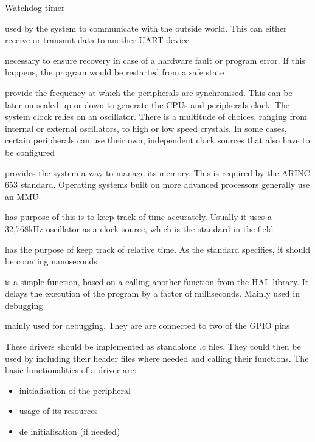 \begin{labeling}{Watchdog timer}
	\item [\textbf{UART}] used by the system to communicate with the outside
	world. This can either receive or transmit data to another UART device
	\item [\textbf{Watchdog timer}] necessary to ensure recovery
	in case of a hardware fault or program error. If this happens, the
	program would be restarted from a safe state
	\item [\textbf{System Clock}] provide the frequency at which the
	peripherals are synchronised. This can be later on scaled up or down
	to generate the CPU\textquotesingle s and peripherals\textquotesingle
	clock.
	The system clock relies on an oscillator.
	There is a multitude of choices, ranging from internal or external
	oscillators, to high or low speed crystals. In some cases, certain
	peripherals can use their own, independent clock sources that also have
	to be configured
	\item [\textbf{MPU}] provides the system a way to manage its
	memory. This is required by the ARINC 653 standard. 
	Operating systems built on more advanced processors generally use 
	an MMU
	\item [\textbf{RTC}] has purpose of this is to keep track of 
	time accurately. Usually it uses  a 32,768kHz oscillator as a 
	clock source, which is the standard in the field
	\item [\textbf{Timing}] has the purpose of keep track of 
	relative time. As the standard specifies, it should be counting 
	nanoseconds
	\item [\textbf{Delay}] is a simple function, based on a calling another
	function from the HAL library. It delays the execution 
	of the program by a factor of milliseconds. Mainly used in debugging
	\item [\textbf{LEDs}] mainly used for debugging. They are
	are connected to two of the GPIO pins
\end{labeling}

These drivers should be implemented as standalone .c files. They could then
be used by including their header files where needed and calling their
functions.
The basic functionalities of a driver are:
\begin{itemize}[noitemsep]
	\item initialisation of the peripheral
	\item usage of its resources
	\item de initialisation (if needed) 
\end{itemize}

